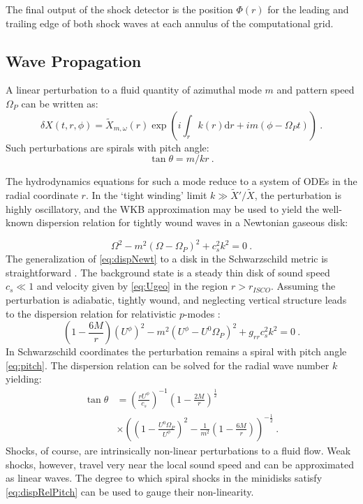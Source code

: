 \documentclass{emulateapj}
\newcommand{\dd}{\mbox{d}}
\begin{document}
The final output of the shock detector is the position $\Phi(r)$ for the leading and trailing edge of both shock waves at each annulus of the computational grid.

\subsection{Wave Propagation}

A linear perturbation to a fluid quantity of azimuthal mode $m$ and pattern speed $\Omega_P$ can be written as:
\begin{equation}
	\delta X(t, r, \phi) = \tilde{X}_{m,\omega}(r) \exp \left( i \int_r k(r) \dd r  + i m (\phi - \Omega_P t) \right)\ . \label{eq:pert}
\end{equation}
Such perturbations are spirals with pitch angle:
\begin{equation}
	\tan \theta = m / k r \ . \label{eq:pitch}
\end{equation}

The hydrodynamics equations for such a mode reduce to a system of ODEs in the radial coordinate $r$.  In the `tight winding' limit $k \gg \tilde{X}'/\tilde{X}$, the perturbation is highly oscillatory, and the WKB approximation may be used to yield the well-known \citep{Binney08} dispersion relation for tightly wound waves in a Newtonian gaseous disk:

\begin{equation}
	\Omega^2 - m^2(\Omega-\Omega_P)^2 + c_s^2 k^2 = 0 \ . \label{eq:dispNewt}
\end{equation}
The generalization of \eqref{eq:dispNewt} to a disk in the Schwarzschild metric is straightforward \citep{Perez97}.  The background state is a steady thin disk of sound speed $c_s \ll 1$ and velocity given by \eqref{eq:Ugeo} in the region $r > r_{ISCO}$.  Assuming the perturbation is adiabatic, tightly wound, and neglecting vertical structure leads to the dispersion relation for relativistic $p$-modes \citep{Abramowicz13}:
\begin{equation}
	\left(1-\frac{6M}{r} \right)\left(U^\phi\right)^2 - m^2(U^\phi-U^0\Omega_P)^2 + g_{rr} c_s^2 k^2 = 0 \ . \label{eq:disprel}
\end{equation}
In Schwarzschild coordinates the perturbation remains a spiral with pitch angle \eqref{eq:pitch}.  The dispersion relation can be solved for the radial wave number $k$ yielding:
\begin{align}
	\tan \theta &= \left( \frac{r U^\phi}{c_s} \right)^{-1} \left(1-\frac{2M}{r}\right)^{\frac{1}{2}} \label{eq:dispRelPitch} \\ \nonumber
		&\times \left(\left(1- \frac{U^0 \Omega_P}{U^\phi}\right)^2 - \frac{1}{m^2}\left(1-\frac{6M}{r}\right)\right)^{-\frac{1}{2}}\ . 
\end{align}
Shocks, of course, are intrinsically non-linear perturbations to a fluid flow.  Weak shocks, however, travel very near the local sound speed and can be approximated as linear waves.  The degree to which spiral shocks in the minidisks satisfy \eqref{eq:dispRelPitch} can be used to gauge their non-linearity.  
\end{document}
